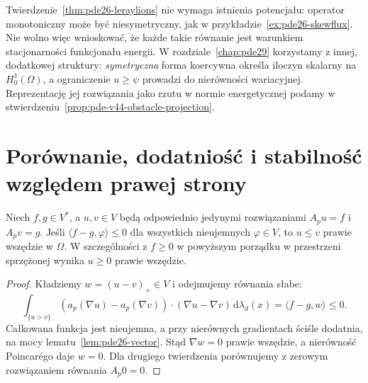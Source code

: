 \begin{uwaga}
\label{rem:pde-v44-minty-obstacle}
Twierdzenie~\ref{thm:pde26-leraylions} nie wymaga istnienia
potencjału: operator monotoniczny może być niesymetryczny,
jak w przykładzie~\ref{ex:pde26-skewflux}. Nie wolno więc
wnioskować, że każde takie równanie jest warunkiem stacjonarności
funkcjonału energii. W rozdziale~\ref{chap:pde29} korzystamy
z innej, dodatkowej struktury: \emph{symetryczna} forma
koercywna określa iloczyn skalarny na $H_0^1(\Omega)$,
a ograniczenie $u\ge\psi$ prowadzi do nierówności wariacyjnej.
Reprezentację jej rozwiązania jako rzutu w normie energetycznej
podamy w stwierdzeniu~\ref{prop:pde-v44-obstacle-projection}.
\end{uwaga}


\section{Porównanie, dodatniość i stabilność względem prawej strony}
\begin{twierdzenie}\label{thm:pde26-comparison}
Niech $f,g\in V^*$, a $u,v\in V$ będą odpowiednio
jedynymi rozwiązaniami $A_pu=f$ i $A_pv=g$.
Jeśli $\langle f-g,\varphi\rangle\le0$ dla wszystkich
nieujemnych $\varphi\in V$, to $u\le v$ prawie wszędzie
w $\Omega$. W szczególności z $f\ge0$ w powyższym
porządku w przestrzeni sprzężonej wynika $u\ge0$ prawie wszędzie.
\end{twierdzenie}
\begin{proof}
Kładziemy $w=(u-v)_+\in V$ i odejmujemy równania słabe:
\[
 \int_{\{u>v\}}(a_p(\nabla u)-a_p(\nabla v))\cdot
 (\nabla u-\nabla v)\,\mathrm d\lambda_d(x)
 =\langle f-g,w\rangle\le0.
\]
Całkowana funkcja jest nieujemna, a przy nierównych
gradientach ściśle dodatnia, na mocy lematu~\ref{lem:pde26-vector}.
Stąd $\nabla w=0$ prawie wszędzie, a nierówność Poincarégo
daje $w=0$. Dla drugiego twierdzenia porównujemy z
zerowym rozwiązaniem równania $A_p0=0$.
\end{proof}

